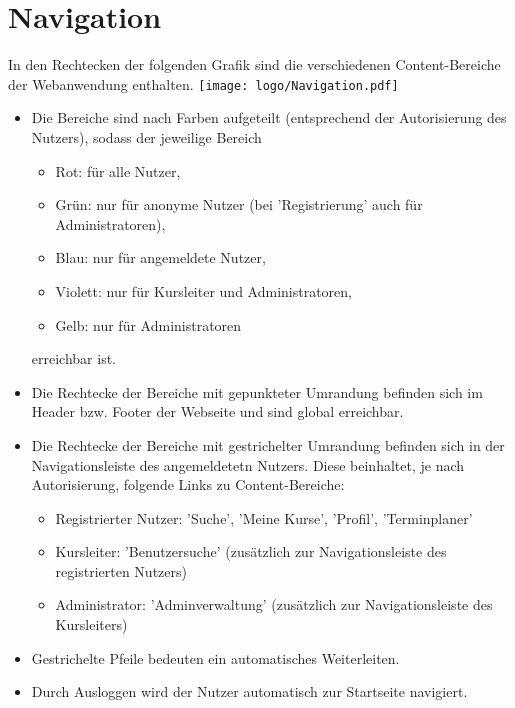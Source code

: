 \documentclass[a4paper]{scrreprt}
\begin{document}
    
    \section{Navigation}
	    In den Rechtecken der folgenden Grafik sind die verschiedenen Content-Bereiche der Webanwendung enthalten.
		    \newline
		    \newline
			    \texttt{[image: logo/Navigation.pdf]}
		    \newline
    
		\begin{itemize}
			\item Die Bereiche sind  nach Farben aufgeteilt (entsprechend der Autorisierung des Nutzers), sodass der jeweilige Bereich
		\begin{itemize}
		    \item Rot: für alle Nutzer,
		    \item Grün: nur für anonyme Nutzer (bei 'Registrierung' auch für Administratoren),
		    \item Blau: nur für angemeldete Nutzer,
		    \item Violett: nur für Kursleiter und Administratoren,
		    \item Gelb: nur für Administratoren
	    \end{itemize}
	    erreichbar ist.
		\item Die Rechtecke der Bereiche mit gepunkteter Umrandung befinden sich im  Header bzw. Footer der Webseite und sind global erreichbar.
		\item Die Rechtecke der Bereiche mit gestrichelter Umrandung befinden sich in der Navigationsleiste des angemeldetetn Nutzers. Diese beinhaltet, je nach Autorisierung, folgende Links zu Content-Bereiche:
		
		\begin{itemize}
		\item Registrierter Nutzer: 'Suche', 'Meine Kurse', 'Profil', 'Terminplaner'
		\item Kursleiter: 'Benutzersuche' (zusätzlich zur Navigationsleiste des registrierten Nutzers)
		\item Administrator: 'Adminverwaltung' (zusätzlich zur Navigationsleiste des Kursleiters)
		\end{itemize}		
		
	    \item Gestrichelte Pfeile bedeuten ein automatisches Weiterleiten.
	    \item Durch Ausloggen wird der Nutzer automatisch zur Startseite navigiert.
	    

\end{itemize}
\end{document}
